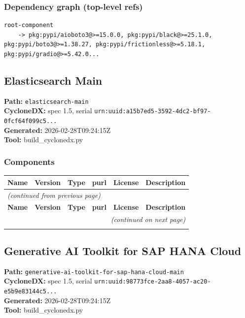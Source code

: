 \documentclass[11pt,a4paper]{article}
\begin{document}
\subsubsection*{Dependency graph (top-level refs)}
\begin{lstlisting}[style=depgraph]
  root-component
    -> pkg:pypi/aioboto3@>=15.0.0, pkg:pypi/black@>=25.1.0, pkg:pypi/boto3@>=1.38.27, pkg:pypi/frictionless@>=5.18.1, pkg:pypi/gradio@>=5.42.0...
\end{lstlisting}

\subsection{Elasticsearch Main}
\textbf{Path:} \texttt{elasticsearch-main}
\\ \textbf{CycloneDX:} spec 1.5, serial \texttt{urn:uuid:a15b7ed5-3592-4dc2-bf97-0fcf64f099c5...}
\\ \textbf{Generated:} 2026-02-28T09:24:15Z
\\ \textbf{Tool:} build\_cyclonedx.py

\subsubsection*{Components}
\begin{longtable}{|p{4cm}|p{2cm}|p{1.6cm}|p{5cm}|p{1.5cm}|p{3.5cm}|}
\toprule
\rowcolor{sbomhdr}\textbf{Name} & \textbf{Version} & \textbf{Type} & \textbf{purl} & \textbf{License} & \textbf{Description} \\
\midrule
\endfirsthead
\multicolumn{6}{l}{\small\itshape (continued from previous page)} \\
\toprule
\rowcolor{sbomhdr}\textbf{Name} & \textbf{Version} & \textbf{Type} & \textbf{purl} & \textbf{License} & \textbf{Description} \\
\midrule
\endhead
\midrule
\multicolumn{6}{r}{\small\itshape (continued on next page)} \\
\endfoot
\bottomrule
\endlastfoot
\end{longtable}

\subsection{Generative AI Toolkit for SAP HANA Cloud}
\textbf{Path:} \texttt{generative-ai-toolkit-for-sap-hana-cloud-main}
\\ \textbf{CycloneDX:} spec 1.5, serial \texttt{urn:uuid:98773fce-2aa8-4057-ac20-e5b9e83144c5...}
\\ \textbf{Generated:} 2026-02-28T09:24:15Z
\\ \textbf{Tool:} build\_cyclonedx.py
\end{document}
